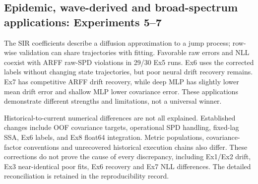 \documentclass{article}
\providecommand{\FloatBarrier}{} %
\begin{document}
\subsection{Epidemic, wave-derived and broad-spectrum applications: Experiments 5--7}
\begin{table}[htbp]\centering\small\caption{Experiment 5: fixed-lag SSA, population 1024. Outer-validation mean $\pm$ sample SD over 30 fitting seeds. Raw covariance RMSE.}\label{tab:ex5}\resizebox{\linewidth}{!}{}\end{table}
\begin{table}[htbp]\centering\small\caption{Experiment 6: corrected wave labels, effective covariance $(g/2)^2$. Outer-validation mean $\pm$ sample SD over 30 fitting seeds. Raw covariance RMSE.}\label{tab:ex6}\resizebox{\linewidth}{!}{}\end{table}
\begin{table}[htbp]\centering\small\caption{Experiment 7: drift with broad spectral support. Outer-validation mean $\pm$ sample SD over 30 fitting seeds. Raw covariance RMSE.}\label{tab:ex7}\resizebox{\linewidth}{!}{}\end{table}
The SIR coefficients describe a diffusion approximation to a jump process; row-wise validation can share trajectories with fitting. Favorable raw errors and NLL coexist with ARFF raw-SPD violations in 29/30 Ex5 runs. Ex6 uses the corrected labels without changing state trajectories, but poor neural drift recovery remains. Ex7 has competitive ARFF drift recovery, while deep MLP has slightly lower mean drift error and shallow MLP lower covariance error. These applications demonstrate different strengths and limitations, not a universal winner.

\begin{table}[htbp]\centering\small\caption{Raw ARFF covariance validity. Historical rows use outer validation; Ex8 uses independent test. Minimum eigenvalue is the worst across seeds and points; floor is used for NLL only.}\resizebox{\linewidth}{!}{}\end{table}

Historical-to-current numerical differences are not all explained. Established changes include OOF covariance targets, operational SPD handling, fixed-lag SSA, Ex6 labels, and Ex8 float64 integration. Metric populations, covariance-factor conventions and unrecovered historical execution chains also differ. These corrections do not prove the cause of every discrepancy, including Ex1/Ex2 drift, Ex3 near-identical poor fits, Ex6 recovery and Ex7 NLL differences. The detailed reconciliation is retained in the reproducibility record.
\FloatBarrier
\end{document}
